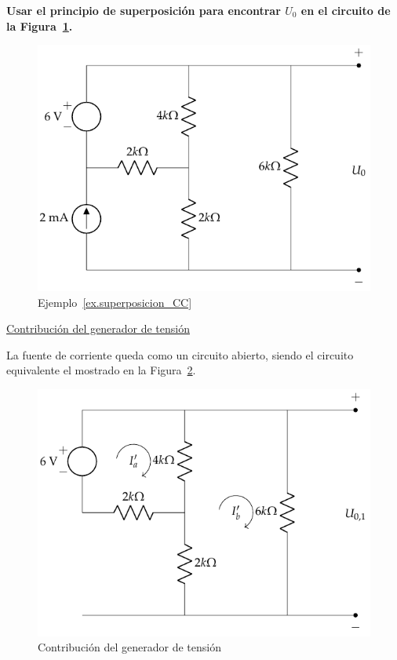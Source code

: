 \documentclass[11pt]{book} %
\begin{document}
\begin{example}\label{ex.superposicion_CC}
    \textbf{Usar el principio de superposición para encontrar $U_0$ en el circuito de la Figura~\ref{fig.ej_superposicion_cc}.}
    \begin{figure}[H]
        \centering
        \includegraphics{../figs/ej_superposicion_cc.pdf}
        \caption{Ejemplo~\ref{ex.superposicion_CC}}
        \label{fig.ej_superposicion_cc}
    \end{figure}
    
    \underline{Contribución del generador de tensión}
    
    La fuente de corriente queda como un circuito abierto, siendo el circuito equivalente el mostrado en la Figura~\ref{fig.ej_superposicion_cc_tension}. 
    \begin{figure}[H]
        \centering
        \includegraphics{../figs/ej_superposicion_cc_tension.pdf}
        \caption{Contribución del generador de tensión}
        \label{fig.ej_superposicion_cc_tension}
    \end{figure}
    

\end{example}
\end{document}
